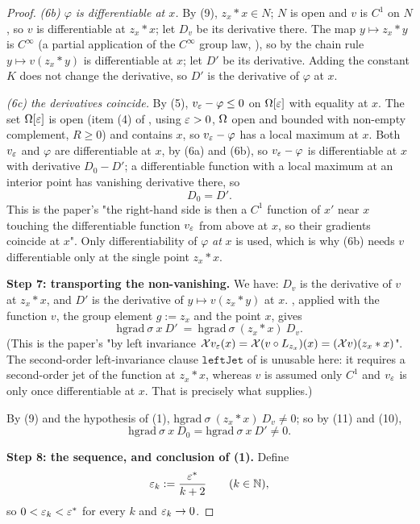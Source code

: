 \begin{proof}
\emph{(6b) $\varphi$ is differentiable at $x$.} By (9), $z_x*x\in N$; $N$ is open and $v$ is
$C^{1}$ on $N$, so $v$ is differentiable at $z_x*x$; let $D_v$ be its derivative there. The
map $y\mapsto z_x*y$ is $C^{\infty}$ (a partial application of the $C^{\infty}$ group law,
), so by the chain rule $y\mapsto v(z_x*y)$ is differentiable at $x$;
let $D'$ be its derivative. Adding the constant $K$ does not change the derivative, so $D'$
is the derivative of $\varphi$ at $x$.

\emph{(6c) the derivatives coincide.} By (5), $v_{\varepsilon}-\varphi\le0$ on $\Omega[\varepsilon]$ with
equality at $x$. The set $\Omega[\varepsilon]$ is open (item (4) of ,
using $\varepsilon>0$, $\Omega$ open and bounded with non-empty complement, $R\ge0$) and contains $x$,
so $v_{\varepsilon}-\varphi$ has a local maximum at $x$. Both $v_{\varepsilon}$ and $\varphi$ are
differentiable at $x$, by (6a) and (6b), so $v_{\varepsilon}-\varphi$ is differentiable at $x$ with
derivative $D_0-D'$; a differentiable function with a local maximum at an interior point has
vanishing derivative there, so
\[
 D_0=D' . \tag{10}
\]
This is the paper's "the right-hand side is then a $C^{1}$ function of $x'$ near $x$ touching
the differentiable function $v_\varepsilon$ from above at $x$, so their gradients coincide at $x$".
Only differentiability of $\varphi$ \emph{at} $x$ is used, which is why (6b) needs $v$
differentiable only at the single point $z_x*x$.

\medskip\noindent\textbf{Step 7: transporting the non-vanishing.} We have: $D_v$ is the
derivative of $v$ at $z_x*x$, and $D'$ is the derivative of $y\mapsto v(z_x*y)$ at $x$.
, applied with the function $v$, the group element $g:=z_x$ and
the point $x$, gives
\[
 \mathrm{hgrad}\ \sigma\ x\ D'\ =\ \mathrm{hgrad}\ \sigma\ (z_x*x)\ D_v . \tag{11}
\]
(This is the paper's "by left invariance
$\mathcal Xv_\varepsilon(x)=\mathcal X(v\circ L_{z_x})(x)=(\mathcal Xv)(z_x*x)$". The second-order
left-invariance clause $\mathtt{leftJet}$ of  is unusable here: it
requires a second-order jet of the function at $z_x*x$, whereas $v$ is assumed only $C^{1}$
and $v_\varepsilon$ is only once differentiable at $x$. That is precisely what
 supplies.)

By (9) and the hypothesis of (1), $\mathrm{hgrad}\ \sigma\ (z_x*x)\ D_v\ne0$; so by (11) and
(10),
\[
 \mathrm{hgrad}\ \sigma\ x\ D_0=\mathrm{hgrad}\ \sigma\ x\ D'\ne0 . \tag{12}
\]

\medskip\noindent\textbf{Step 8: the sequence, and conclusion of (1).} Define
\[
 \varepsilon_k:=\frac{\varepsilon^{*}}{k+2}\qquad(k\in\mathbb N),
\]
so $0<\varepsilon_k<\varepsilon^{*}$ for every $k$ and $\varepsilon_k\to0$.


\end{proof}

